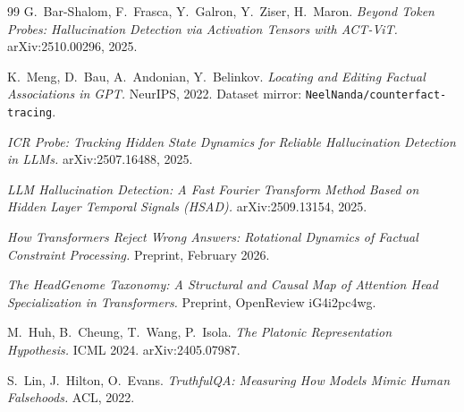 \documentclass[11pt]{article}
\begin{document}
\begin{thebibliography}{99}
 G.~Bar-Shalom, F.~Frasca, Y.~Galron, Y.~Ziser,
H.~Maron. \emph{Beyond Token Probes: Hallucination Detection via Activation
Tensors with ACT-ViT.} arXiv:2510.00296, 2025.

 K.~Meng, D.~Bau, A.~Andonian, Y.~Belinkov.
\emph{Locating and Editing Factual Associations in GPT.}
NeurIPS, 2022. Dataset mirror: \texttt{NeelNanda/counterfact-tracing}.

 \emph{ICR Probe: Tracking Hidden State Dynamics for
Reliable Hallucination Detection in LLMs.} arXiv:2507.16488, 2025.

 \emph{LLM Hallucination Detection: A Fast Fourier
Transform Method Based on Hidden Layer Temporal Signals (HSAD).}
arXiv:2509.13154, 2025.

 \emph{How Transformers Reject Wrong Answers:
Rotational Dynamics of Factual Constraint Processing.}
Preprint, February 2026.

 \emph{The HeadGenome Taxonomy: A Structural and Causal
Map of Attention Head Specialization in Transformers.}
Preprint, OpenReview iG4i2pc4wg.

 M.~Huh, B.~Cheung, T.~Wang, P.~Isola.
\emph{The Platonic Representation Hypothesis.}
ICML 2024. arXiv:2405.07987.

 S.~Lin, J.~Hilton, O.~Evans.
\emph{TruthfulQA: Measuring How Models Mimic Human Falsehoods.} ACL, 2022.

\end{thebibliography}
\end{document}
